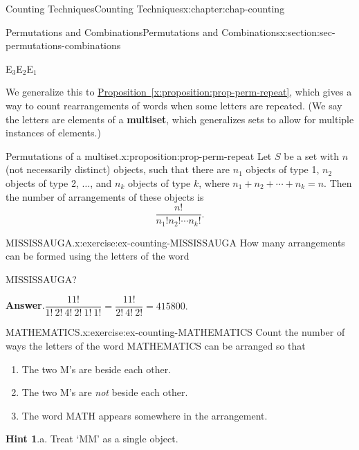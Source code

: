 \documentclass[oneside,10pt,]{book}
\newcommand{\blocktitlefont}{\relax}
\newcommand{\xreffont}{\relax}
\newcommand{\terminology}[1]{\textbf{#1}}
\numberwithin{equation}{section}
\begin{document}
\begin{chapterptx}{Counting Techniques}{}{Counting Techniques}{}{}{x:chapter:chap-counting}
\begin{sectionptx}{Permutations and Combinations}{}{Permutations and Combinations}{}{}{x:section:sec-permutations-combinations}
\begin{sidebyside}{6}{0.0233333333333333}{0.0233333333333333}{0.0466666666666667}
\begin{sbspanel}{0.12}
E\(_3\)E\(_2\)E\(_1\)%
\end{sbspanel}%
\end{sidebyside}%
\par
We generalize this to \hyperref[x:proposition:prop-perm-repeat]{Proposition~{\xreffont\ref{x:proposition:prop-perm-repeat}}}, which gives a way to count rearrangements of words when some letters are repeated. (We say the letters are elements of a \terminology{multiset}, which generalizes sets to allow for multiple instances of elements.)%
\begin{proposition}{Permutations of a multiset.}{}{x:proposition:prop-perm-repeat}%
Let \(S\) be a set with \(n\) (not necessarily distinct) objects, such that there are \(n_1\) objects of type 1, \(n_2\) objects of type 2, \(\ldots\), and \(n_k\) objects of type \(k\), where \(n_1 + n_2 + \cdots + n_k = n\). Then the number of arrangements of these objects is%
\begin{equation*}
\dfrac{n!}{n_1! n_2! \cdots n_k!}\text{.}
\end{equation*}
%
\end{proposition}
\begin{inlineexercise}{MISSISSAUGA.}{x:exercise:ex-counting-MISSISSAUGA}%
How many arrangements can be formed using the letters of the word%
\begin{sidebyside}{1}{0.375}{0.375}{0}%
\begin{sbspanel}{0.25}%
MISSISSAUGA?%
\end{sbspanel}%
\end{sidebyside}%
\par\smallskip%
\noindent\textbf{\blocktitlefont Answer}.\hypertarget{g:answer:id226880}{}\quad{}\(\dfrac{11!}{1!\ 2!\ 4!\ 2!\ 1!\ 1!} = \dfrac{11!}{2!\ 4!\ 2!} = 415800.\)%
\end{inlineexercise}
\begin{inlineexercise}{MATHEMATICS.}{x:exercise:ex-counting-MATHEMATICS}%
Count the number of ways the letters of the word MATHEMATICS can be arranged so that%
\begin{enumerate}[label=(\alph*)]
\item{}The two M's are beside each other.%
\item{}The two M's are \emph{not} beside each other.%
\item{}The word MATH appears somewhere in the arrangement.%
\end{enumerate}
%
\par\smallskip%
\noindent\textbf{\blocktitlefont Hint 1}.\hypertarget{g:hint:id226949}{}\quad{}a. Treat `MM' as a single object.%

\end{inlineexercise}
\end{sectionptx}
\end{chapterptx}
\end{document}
